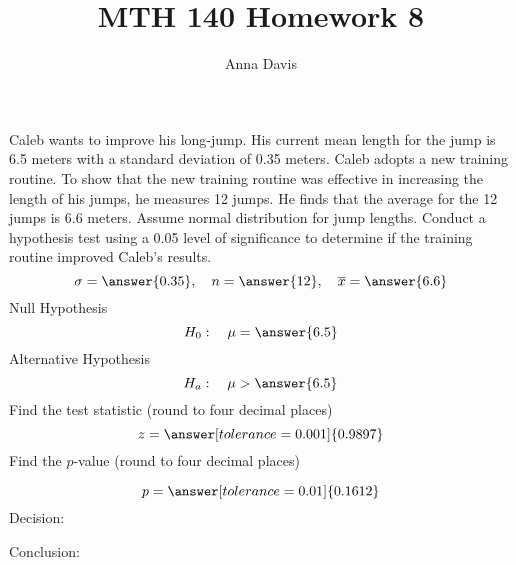 \documentclass{ximera}
\author{Anna Davis} \title{MTH 140 Homework 8}
\begin{document}
\begin{abstract}

\end{abstract}
\maketitle
 \begin{problem}\label{prob:140hom9prob4}
Caleb wants to improve his long-jump.  His current mean length for the jump is 6.5 meters with a standard deviation of 0.35 meters.  Caleb adopts a new training routine.  To show that the new training routine was effective in increasing the length of his jumps, he measures 12 jumps. He finds that the average for the 12 jumps is 6.6 meters.  Assume normal distribution for jump lengths.  Conduct a hypothesis test using a 0.05 level of significance to determine if the training routine improved Caleb's results.
$$\sigma=\answer{0.35},\quad n=\answer{12},\quad \overline{x}=\answer{6.6}$$
Null Hypothesis
$$H_0:\quad \mu=\answer{6.5}$$
Alternative Hypothesis
$$H_a:\quad \mu>\answer{6.5}$$
Find the test statistic (round to four decimal places)
$$z=\answer[tolerance=0.001]{0.9897}$$
Find the $p$-value (round to four decimal places)
\begin{center}  
\end{center}
$$p=\answer[tolerance=0.01]{0.1612}$$
Decision:

\begin{multipleChoice} 
\end{multipleChoice}  

Conclusion:

\begin{multipleChoice} 
\end{multipleChoice} 
\end{problem}
\end{document}
